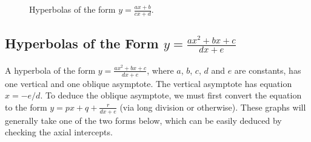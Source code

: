 \begin{figure}[H]
    \centering
    \caption{Hyperbolas of the form $y = \frac{ax + b}{cx + d}$.}
\end{figure}

\subsection{Hyperbolas of the Form $y = \frac{ax^2 + bx + c}{dx + e}$}

A hyperbola of the form $y = \frac{ax^2 + bx + c}{dx + e}$, where $a$, $b$, $c$, $d$ and $e$ are constants, has one vertical and one oblique asymptote. The vertical asymptote has equation $x = -e/d$. To deduce the oblique asymptote, we must first convert the equation to the form $y = px + q + \frac{r}{dx + e}$ (via long division or otherwise). These graphs will generally take one of the two forms below, which can be easily deduced by checking the axial intercepts.

